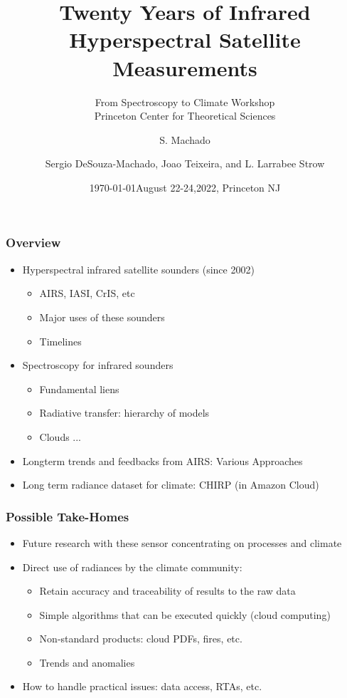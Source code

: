 \documentclass[10pt,t]{beamer}
\author{S. Machado}
\date{\today}
\title{\large Twenty Years of Infrared Hyperspectral Satellite Measurements}
\subtitle{\footnotesize{From Spectroscopy to Climate Workshop \\ \vspace{-0.07in} Princeton Center for Theoretical Sciences}}
\date{\vspace{0.1in}\footnotesize{August 22-24,2022, Princeton NJ \vfill}}
\author{Sergio DeSouza-Machado\inst{1}, Joao Teixeira\inst{2}, and L. Larrabee Strow\inst{1}}
\institute{\inst{1}UMBC Physics Department \and \inst{2}NASA Jet Propulsion Laboratory}
\begin{document}
\maketitle
\begin{frame}
  \frametitle{Overview}  
  \begin{itemize}
  \item Hyperspectral infrared satellite sounders (since 2002)
    \begin{itemize}
    \item AIRS, IASI, CrIS, etc
    \item Major uses of these sounders
    \item Timelines
    \end{itemize}
  \item Spectroscopy for infrared sounders
    \begin{itemize}
    \item Fundamental liens
    \item Radiative transfer: hierarchy of models
    \item Clouds ...
    \end{itemize}
  \end{itemize}
  \begin{itemize}
  \item Longterm trends and feedbacks from AIRS: Various Approaches
  \item Long term radiance dataset for climate: CHIRP (in Amazon Cloud)
  \end{itemize}
\end{frame}
\begin{frame}
  \frametitle{Possible Take-Homes}
  \begin{itemize}
  \item Future research with these sensor concentrating on processes and climate
  \item Direct use of radiances by the climate community:
    \begin{itemize}
    \item Retain accuracy and traceability of results to the raw data
    \item Simple algorithms that can be executed quickly (cloud computing)
    \item Non-standard products: cloud PDFs, fires, etc.
    \item Trends and anomalies
    \end{itemize}
    \item How to handle practical issues: data access, RTAs, etc.
  \end{itemize}
\end{frame}
\end{document}
